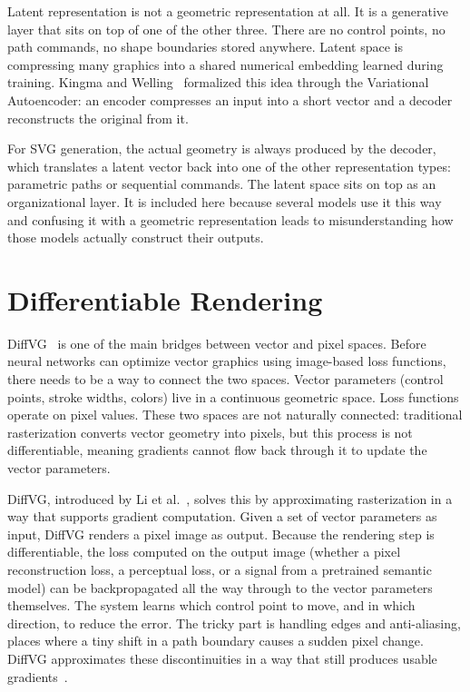 Latent representation is not a geometric representation at all. 
It is a generative layer that sits on top of one of the other three.
There are no control points, no path commands, no shape boundaries 
stored anywhere. Latent space is compressing many graphics
into a shared numerical embedding learned during training. 
Kingma and Welling~\cite{kingmaAutoEncodingVariationalBayes2022} 
formalized this idea through the Variational Autoencoder: 
an encoder compresses an input into a short vector and a 
decoder reconstructs the original from it.

For SVG generation, the actual geometry is always produced 
by the decoder, which translates a latent vector back into 
one of the other representation types: parametric paths or sequential commands.
The latent space sits on top as an organizational layer. It is included 
here because several models use it this way and confusing 
it with a geometric representation leads to misunderstanding 
how those models actually construct their outputs.



\section{Differentiable Rendering}
\label{sec:diffvg}

DiffVG~\cite{liDifferentiableVectorGraphics2020a} is one of the main bridges between vector and pixel spaces. 
Before neural networks can optimize vector graphics using 
image-based loss functions, there needs to be a way to connect 
the two spaces. Vector parameters (control points, stroke widths, colors) live
in a continuous geometric space. Loss 
functions operate on pixel values. These two spaces are not 
naturally connected: traditional rasterization converts vector 
geometry into pixels, but this process is not differentiable, 
meaning gradients cannot flow back through it to update the 
vector parameters.

DiffVG, introduced by Li et al.~\cite{liDifferentiableVectorGraphics2020a}, 
solves this by approximating rasterization in a way that 
supports gradient computation. Given a set of vector 
parameters as input, DiffVG renders a pixel image as output. 
Because the rendering step is differentiable, the loss computed 
on the output image (whether a pixel reconstruction loss,
a perceptual loss, or a signal from a pretrained semantic model) 
can be backpropagated all the way through to the 
vector parameters themselves. The system learns which control 
point to move, and in which direction, to reduce the error. 
The tricky part is handling edges and anti-aliasing, places 
where a tiny shift in a path boundary causes a sudden pixel 
change. DiffVG approximates these discontinuities in a way 
that still produces usable gradients~\cite{liDifferentiableVectorGraphics2020a}.

